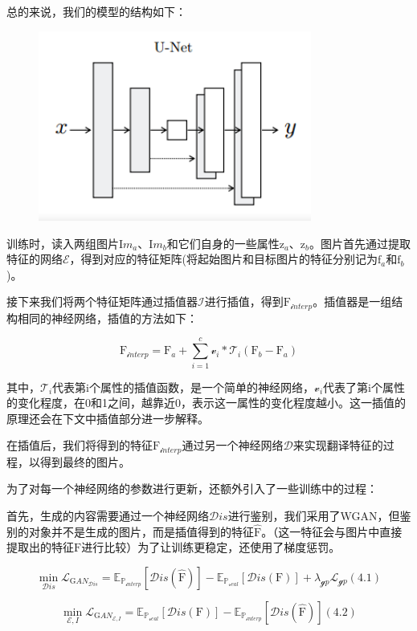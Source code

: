 \documentclass[UTF8,a4paper，12pt]{article}
\def\MC {\mathcal}
\theoremstyle{theorem}
\theoremstyle{definition}
\begin{document}
总的来说，我们的模型的结构如下：

\begin{figure}[htbp]
	\centering
	\includegraphics[width=0.8\textwidth]{assets/10}
	\caption{}
\end{figure}
训练时，读入两组图片$\mathrm Im_a$、$\mathrm Im_b$和它们自身的一些属性$\mathrm z_a$、$\mathrm z_b$。图片首先通过提取特征的网络$\MC E$，得到对应的特征矩阵(将起始图片和目标图片的特征分别记为$\mathrm f_a$和$\mathrm f_b$)。

接下来我们将两个特征矩阵通过插值器$\MC I$进行插值，得到$\mathrm F_{\MC interp}$。插值器是一组结构相同的神经网络，插值的方法如下：

$$\mathrm F_{\MC interp} = \mathrm F_a + \sum_{i=1}^{c}{\MC v_i * \MC T_i(\mathrm F_b - \mathrm F_a)}$$

其中，$\MC T_i$代表第$\mathrm i$个属性的插值函数，是一个简单的神经网络，$\MC v_i$代表了第$\mathrm i$个属性的变化程度，在0和1之间，越靠近0，表示这一属性的变化程度越小。这一插值的原理还会在下文中插值部分进一步解释。

在插值后，我们将得到的特征$\mathrm F_{\MC interp}$通过另一个神经网络$\MC D$来实现翻译特征的过程，以得到最终的图片。

为了对每一个神经网络的参数进行更新，还额外引入了一些训练中的过程：

首先，生成的内容需要通过一个神经网络$\MC Dis$进行鉴别，我们采用了WGAN，但鉴别的对象并不是生成的图片，而是插值得到的特征$\hat{\mathrm F}$。（这一特征会与图片中直接提取出的特征$\mathrm F$进行比较）为了让训练更稳定，还使用了梯度惩罚。

$$\min_{\MC Dis} \MC L_{\mathrm GAN_{\MC Dis}} = \mathbb E_{\mathbb P_{\MC interp}}[\MC Dis(\hat{\mathrm F})] - \mathbb E_{\mathbb P_{\MC real}}[\MC Dis(\mathrm F)] + \lambda_{\MC gp}\MC L_{\MC gp}    (4.1)$$

$$\min_{\MC E,I} \MC L_{\mathrm GAN_{\MC E,I}} = \mathbb E_{\mathbb P_{\MC real}}[\MC Dis(\mathrm F)] - \mathbb E_{\mathbb P_{\MC interp}}[\MC Dis(\hat{\mathrm F})]    (4.2)$$
\end{document}
